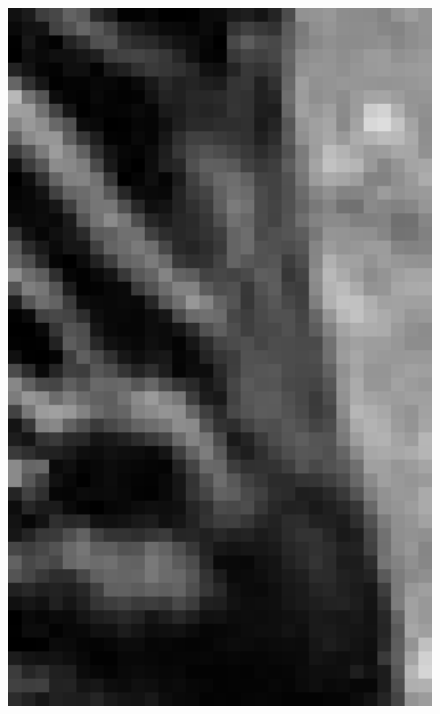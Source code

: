 \documentclass[review,numbers,sort&compress]{elsarticle}  %
\begin{document}
\begin{figure}[t]
{\begin{minipage}[b]{0.15\textwidth}
                \includegraphics[width=1\textwidth]{compareImage/OUR_zebra_mag_G_2.png}
            \end{minipage}
        }
\end{figure}
\end{document}
